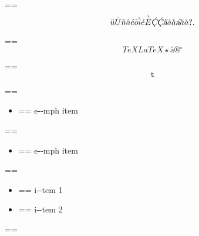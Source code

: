 \documentclass{book}
\makeatletter
\newenvironment{GNUTexinfopreformatted}{%
  \par\GNUTobeylines\obeyspaces\frenchspacing
  \parskip=\z@\parindent=\z@}{}
{\catcode`\^^M=13 \gdef\GNUTobeylines{\catcode`\^^M=13 \def^^M{\null\par}}}
\newenvironment{GNUTexinfoindented}
  {\begin{list}{}{}
  \item\relax}
  {\end{list}}
\makeatother
\begin{document}
\begin{GNUTexinfoindented}
\begin{GNUTexinfopreformatted}
\end{GNUTexinfopreformatted}
$$
\ddot{u} \ddot{U} \tilde{n} \hat{a} \acute{e} \bar{o} \grave{i} \acute{e} \grave{\bar{E}}
\textsl{\c{\'{C}}} \textsl{\c{\'{C}}} \textsl{\H{a}} \dot{a} \mathring{a} \textsl{\t{a}}
\breve{a} \check{a}
 ? .
$$
\begin{GNUTexinfopreformatted}%
\ttfamily 
\end{GNUTexinfopreformatted}
$$
TeX LaTeX \star{} \mathord{\text{\aa{}}} \circledR{} ^{\circ{}} 
$$
\begin{GNUTexinfopreformatted}%
\ttfamily 
\end{GNUTexinfopreformatted}
$$
\mathtt{t} 
$$
\begin{GNUTexinfopreformatted}%
\ttfamily 
\end{GNUTexinfopreformatted}
\begin{itemize}[label=\emph{}]
\item \begin{GNUTexinfopreformatted}%
\ttfamily e{-}{-}mph item
\end{GNUTexinfopreformatted}
\end{itemize}
\begin{GNUTexinfopreformatted}%
\ttfamily 
\end{GNUTexinfopreformatted}
\begin{itemize}[label=\emph{} after emph]
\item \begin{GNUTexinfopreformatted}%
\ttfamily e{-}{-}mph item
\end{GNUTexinfopreformatted}
\end{itemize}
\begin{GNUTexinfopreformatted}%
\ttfamily 
\end{GNUTexinfopreformatted}
\begin{itemize}[label=\textbullet{} a--n itemize line]
\item \begin{GNUTexinfopreformatted}%
\ttfamily i{-}{-}tem 1
\end{GNUTexinfopreformatted}
\item \begin{GNUTexinfopreformatted}%
\ttfamily i{-}{-}tem 2
\end{GNUTexinfopreformatted}
\end{itemize}
\begin{GNUTexinfopreformatted}%
\ttfamily 
\end{GNUTexinfopreformatted}
\begin{itemize}[label={}]

\end{itemize}
\end{GNUTexinfoindented}
\end{document}
